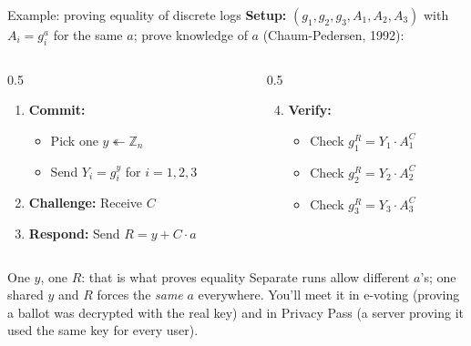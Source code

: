 \ifdefined\PRESENTATION\else\PassOptionsToClass{handout}{beamer}\fi\documentclass[aspectratio=169, lualatex]{beamer}
\begin{document}
\begin{frame}{Example: proving equality of discrete logs}
	\textbf{Setup:} $(g_1, g_2, g_3, A_1, A_2, A_3)$ with $A_i = g_i^a$ for the same $a$; prove knowledge of $a$ (Chaum-Pedersen, 1992):
	\begin{columns}[c]
		\begin{column}{0.5\textwidth}
			\begin{enumerate}
				\item \textbf{Commit:}
				      \begin{itemize}
					      \item Pick one $y \twoheadleftarrow \mathbb{Z}_n$
					      \item Send $Y_i = g_i^y$ for $i = 1, 2, 3$
				      \end{itemize}
				\item \textbf{Challenge:} Receive $C$
				\item \textbf{Respond:} Send $R = y + C \cdot a$
			\end{enumerate}
		\end{column}
		\begin{column}{0.5\textwidth}
			\begin{enumerate}
				\setcounter{enumi}{3}
				\item \textbf{Verify:}
				      \begin{itemize}
					      \item Check $g_1^R = Y_1 \cdot A_1^C$
					      \item Check $g_2^R = Y_2 \cdot A_2^C$
					      \item Check $g_3^R = Y_3 \cdot A_3^C$
				      \end{itemize}
			\end{enumerate}
		\end{column}
	\end{columns}
	\begin{alertblock}{One $y$, one $R$: that is what proves equality}
		Separate runs allow different $a$'s; one shared $y$ and $R$ forces the \textit{same} $a$ everywhere. You'll meet it in e-voting (proving a ballot was decrypted with the real key) and in Privacy Pass (a server proving it used the same key for every user).
	\end{alertblock}
\end{frame}
\end{document}
